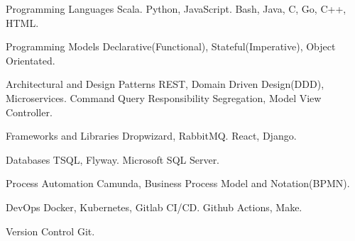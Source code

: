 

\begin{cvskills}
  \cvskill
    {Programming Languages} %
    {  Scala.} 
  \cvskill
    {} %
    {  Python, JavaScript. } 
  \cvskill
    {} %
    {  Bash, Java, C, Go, C++, HTML.} 

  \cvskill
    {Programming Models} %
    { Declarative(Functional), Stateful(Imperative), Object Orientated.} 

  \cvskill
    {Architectural and Design Patterns} %
    {  REST, Domain Driven Design(DDD), Microservices.}
    \cvskill
    {} %
    {  Command Query Responsibility Segregation, Model View Controller.} 

  \cvskill
    {Frameworks and Libraries} %
    {  Dropwizard, RabbitMQ.} 
  \cvskill
    {} %
    {  React, Django.} 

  \cvskill
  {Databases} %
  {  TSQL, Flyway.} 
  \cvskill
  {} %
  {  Microsoft SQL Server.} 

  \cvskill
    {Process Automation}
    { Camunda, Business Process Model and Notation(BPMN).}

  \cvskill
    {DevOps} %
    { Docker, Kubernetes, Gitlab CI/CD.} %
  \cvskill
    {} %
    {  Github Actions, Make.} 

  \cvskill
  {Version Control} %
  { Git.} %

\end{cvskills}
